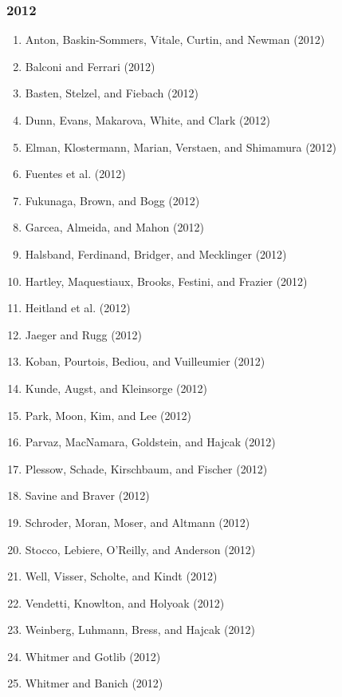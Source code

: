 \documentclass[english,man]{apa6}
\providecommand{\tightlist}{%
  \setlength{\itemsep}{0pt}\setlength{\parskip}{0pt}}
\begin{document}
\subsubsection{2012}\label{section-36}

\begin{enumerate}
\def\labelenumi{\arabic{enumi})}
\tightlist
\item
  Anton, Baskin-Sommers, Vitale, Curtin, and Newman (2012)
\item
  Balconi and Ferrari (2012)
\item
  Basten, Stelzel, and Fiebach (2012)
\item
  Dunn, Evans, Makarova, White, and Clark (2012)
\item
  Elman, Klostermann, Marian, Verstaen, and Shimamura (2012)
\item
  Fuentes et al. (2012)
\item
  Fukunaga, Brown, and Bogg (2012)
\item
  Garcea, Almeida, and Mahon (2012)
\item
  Halsband, Ferdinand, Bridger, and Mecklinger (2012)
\item
  Hartley, Maquestiaux, Brooks, Festini, and Frazier (2012)
\item
  Heitland et al. (2012)
\item
  Jaeger and Rugg (2012)
\item
  Koban, Pourtois, Bediou, and Vuilleumier (2012)
\item
  Kunde, Augst, and Kleinsorge (2012)
\item
  Park, Moon, Kim, and Lee (2012)
\item
  Parvaz, MacNamara, Goldstein, and Hajcak (2012)
\item
  Plessow, Schade, Kirschbaum, and Fischer (2012)
\item
  Savine and Braver (2012)
\item
  Schroder, Moran, Moser, and Altmann (2012)
\item
  Stocco, Lebiere, O'Reilly, and Anderson (2012)
\item
  Well, Visser, Scholte, and Kindt (2012)
\item
  Vendetti, Knowlton, and Holyoak (2012)
\item
  Weinberg, Luhmann, Bress, and Hajcak (2012)
\item
  Whitmer and Gotlib (2012)
\item
  Whitmer and Banich (2012)
\end{enumerate}
\end{document}
